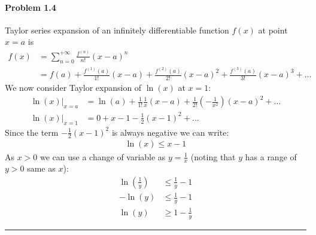 \documentclass[12pt, letterpaper]{scrartcl}
\begin{document}
\paragraph*{Problem 1.4} \hfill\newline
Taylor series expansion of an infinitely differentiable function $f(x)$ at point $x=a$ is
\begin{align*}
    f(x)&=\sum_{n=0}^{+\infty}\frac{f^{(n)}}{n!}(x-a)^n\\
    &=f(a)+\frac{f^{(1)}(a)}{1!}(x-a)+\frac{f^{(2)}(a)}{2!}(x-a)^2+\frac{f^{(3)}(a)}{3!}(x-a)^3+\dots
\end{align*}
We now consider Taylor expansion of $\ln(x)$ at $x=1$:
\begin{align*}
    \ln(x)\bigg\rvert_{x=a}&=\ln(a)+\frac{1}{1!}\frac{1}{x}(x-a)+\frac{1}{2!}(-\frac{1}{x^2})(x-a)^2+\dots\\
    \ln(x)\bigg\rvert_{x=1}&=0+x-1-\frac{1}{2}(x-1)^2+\dots
\end{align*}
Since the term $-\frac{1}{2}(x-1)^2$ is always negative we can write:
\begin{align*}
    \ln(x)\leq x-1
\end{align*}
As $x>0$ we can use a change of variable as $y=\frac{1}{x}$ (noting that $y$ has a range of $y>0$ same as $x$):
    \begin{align*}
    \ln(\frac{1}{y})&\leq \frac{1}{y}-1\\
    -\ln(y)&\leq \frac{1}{y}-1\\
    \ln(y)&\geq 1-\frac{1}{y}
    \end{align*}
\hrule
\end{document}
